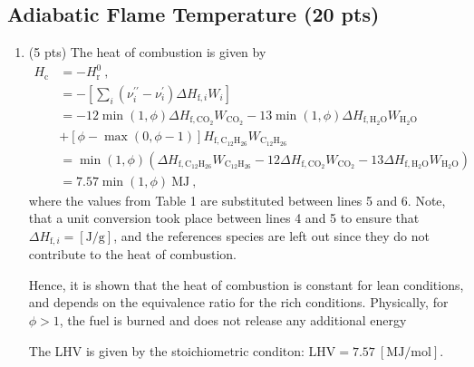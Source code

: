 \documentclass[12pt]{article}
\newcommand{\dod}{\mathrm{C}_{12}\mathrm{H}_{26}}
\newcommand{\wat}{\mathrm{H}_{2}\mathrm{O}}
\newcommand{\cardiox}{\mathrm{C}\mathrm{O}_{2}}
\begin{document}
	\subsection{Adiabatic Flame Temperature (20 pts)}
	\begin{enumerate}[label=(\alph*)]
		\item (5 pts)
		The heat of combustion is given by
			\begin{equation}
				\begin{aligned}
					H_\mathrm{c}&=-H_\mathrm{r}^0\ , \\
					&=-\left[\sum_i(\nu_i^{\prime\prime}-\nu_i^{\prime})\Delta H_{\mathrm{f},i}W_i\right]\\
					&=-12\min(1,\phi)\Delta H_{\mathrm{f},\cardiox}W_{\cardiox}-13\min(1,\phi)\Delta H_{\mathrm{f},\wat}W_{\wat}\\
					&+[\phi-\max(0,\phi-1)] H_{\mathrm{f},\dod}W_{\dod}\\
					&=\min(1,\phi)\left(\Delta H_{\mathrm{f},\dod}W_{\dod}-12\Delta H_{\mathrm{f},\cardiox}W_{\cardiox}-13\Delta H_{\mathrm{f},\wat}W_{\wat}\right) \\
					&=\boxed{7.57\min(1,\phi)\ \mathrm{MJ}}\ ,
				\end{aligned}
			\end{equation}
		where the values from Table 1 are substituted between lines 5 and 6. Note, that a unit conversion took place between lines 4 and 5 to ensure that $\Delta H_{\mathrm{f},i}=\mathrm{[J/g]}$, and the references species are left out since they do not contribute to the heat of combustion. 
		
		Hence, it is shown that the heat of combustion is constant for lean conditions, and depends on the equivalence ratio for the rich conditions. Physically, for $\phi>1$, the fuel is burned and does not release any additional energy
		
		The LHV is given by the stoichiometric conditon: $\boxed{\mathrm{LHV=7.57\ [MJ/mol]}}$.
		

\end{enumerate}
\end{document}
